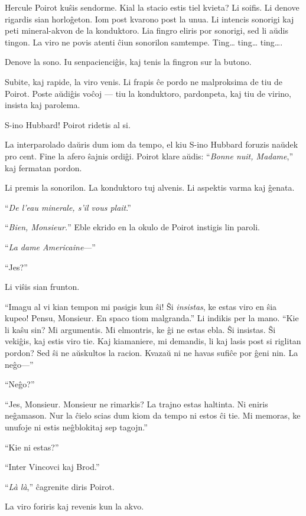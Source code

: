 Hercule Poirot kuŝis sendorme. Kial la stacio estis tiel kvieta? Li soifis. Li denove rigardis sian horloĝeton. Iom post kvarono post la unua. Li intencis sonorigi kaj peti mineral-akvon de la konduktoro. Lia fingro eliris por sonorigi, sed li aŭdis tingon. La viro ne povis atenti ĉiun sonorilon samtempe. Ting{\ldots} ting{\ldots} ting{\ldots}.

Denove la sono. Iu senpacienciĝis, kaj tenis la fingron sur la butono.

Subite, kaj rapide, la viro venis. Li frapis ĉe pordo ne malproksima de tiu de Poirot. Poste aŭdiĝis voĉoj --- tiu la konduktoro, pardonpeta, kaj tiu de virino, insista kaj parolema.

S-ino Hubbard! Poirot ridetis al si.

La interparolado daŭris dum iom da tempo, el kiu S-ino Hubbard foruzis naŭdek pro cent. Fine la afero ŝajnis ordiĝi. Poirot klare aŭdis: ``\emph{Bonne nuit, Madame},'' kaj fermatan pordon.

Li premis la sonorilon. La konduktoro tuj alvenis. Li aspektis varma kaj ĝenata.

``\emph{De l'eau minerale, s'il vous plait}.''

``\emph{Bien, Monsieur.}'' Eble ekrido en la okulo de Poirot instigis lin paroli.

``\emph{La dame Americaine}---''

``Jes?''

Li viŝis sian frunton.

``Imagu al vi kian tempon mi pasigis kun ŝi! Ŝi \emph{insistas}, ke estas viro en ŝia kupeo! Pensu, Monsieur. En spaco tiom malgranda.'' Li indikis per la mano. ``Kie li kaŝu sin? Mi argumentis. Mi elmontris, ke ĝi ne estas ebla. Ŝi insistas. Ŝi vekiĝis, kaj estis viro tie. Kaj kiamaniere, mi demandis, li kaj lasis post si riglitan pordon? Sed ŝi ne aŭskultos la racion. Kvazaŭ ni ne havas sufiĉe por ĝeni nin. La neĝo---''

``Neĝo?''

``Jes, Monsieur. Monsieur ne rimarkis? La trajno estas haltinta. Ni eniris neĝamason. Nur la ĉielo scias dum kiom da tempo ni estos ĉi tie. Mi memoras, ke unufoje ni estis neĝblokitaj sep tagojn.''

``Kie ni estas?''

``Inter Vincovci kaj Brod.''

``\emph{Là là},'' ĉagrenite diris Poirot.

La viro foriris kaj revenis kun la akvo.


